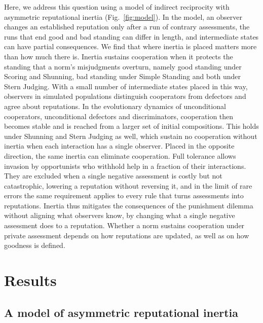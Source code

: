 \documentclass[10pt]{wlscirep}
\theoremstyle{plain}
\theoremstyle{remark}
\begin{document}
Here, we address this question using a model of indirect reciprocity with asymmetric reputational inertia (Fig.~\ref{fig:model}). In the model, an observer changes an established reputation only after a run of contrary assessments, the runs that end good and bad standing can differ in length, and intermediate states can have partial consequences. We find that where inertia is placed matters more than how much there is. Inertia sustains cooperation when it protects the standing that a norm's misjudgments overturn, namely good standing under Scoring and Shunning, bad standing under Simple Standing and both under Stern Judging. With a small number of intermediate states placed in this way, observers in simulated populations distinguish cooperators from defectors and agree about reputations. In the evolutionary dynamics of unconditional cooperators, unconditional defectors and discriminators, cooperation then becomes stable and is reached from a larger set of initial compositions. This holds under Shunning and Stern Judging as well, which sustain no cooperation without inertia when each interaction has a single observer. Placed in the opposite direction, the same inertia can eliminate cooperation. Full tolerance allows invasion by opportunists who withhold help in a fraction of their interactions. They are excluded when a single negative assessment is costly but not catastrophic, lowering a reputation without reversing it, and in the limit of rare errors the same requirement applies to every rule that turns assessments into reputations. Inertia thus mitigates the consequences of the punishment dilemma without aligning what observers know, by changing what a single negative assessment does to a reputation. Whether a norm sustains cooperation under private assessment depends on how reputations are updated, as well as on how goodness is defined.

\section*{Results}

\subsection*{A model of asymmetric reputational inertia}
\end{document}
